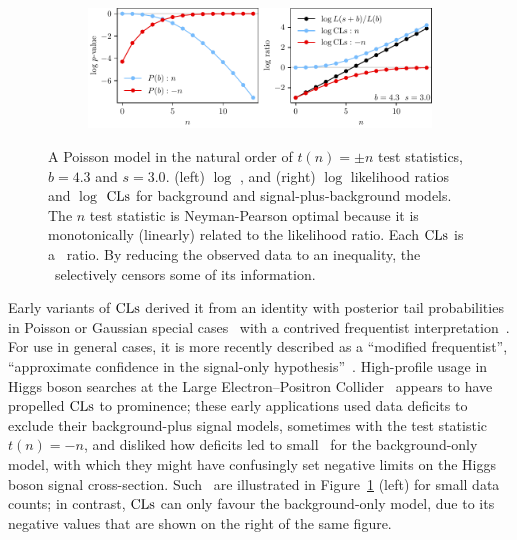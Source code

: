 \begin{figure}[tp]
\centering
\begin{subfigure}{\textwidth}
\centering
\includegraphics[width=\textwidth]{figures/searches_cls_plots_with_pvals_n.pdf}
\end{subfigure}
\caption[
A Poisson model in the natural order
]{%
A Poisson model in the natural order of $t(n) = \pm n$
test statistics, $b = 4.3$ and $s = 3.0$.
(left) $\log$ \pvalues,
and (right) $\log$ likelihood ratios and $\log$ $\mathrm{CLs}$ for
background and signal-plus-background models.
The $n$ test statistic is Neyman-Pearson optimal because it is monotonically
(linearly) related to the likelihood ratio.
Each $\mathrm{CLs}$ is a \pvalue\ ratio.
By reducing the observed data to an inequality, the \pvalue\ selectively
censors some of its information.
}
\label{fig:searches_sb_n}
\end{figure}

Early variants of $\mathrm{CLs}$ derived it from an identity with posterior tail
probabilities in Poisson or Gaussian special cases~\cite{
Helene1983upper,
pdg1988,
read2000modified,
pdg2022ynf
}
with a contrived frequentist interpretation~\cite{zech1988cls}.
For use in general cases, it is more recently described as a
``modified frequentist'',
``approximate confidence in the signal-only hypothesis''~\cite{
read2000modified,
Read2002cls
}.
High-profile usage in Higgs boson searches at the
Large Electron–Positron Collider~\cite{
read1997optimal,
bock1998lower,
etde1998prospects,
junk1999confidence,
lep2000searches,
lep2003search
}
appears to have propelled $\mathrm{CLs}$ to prominence;
these early applications used data deficits to exclude their
background-plus signal models, sometimes with the test statistic $t(n) = -n$,
and disliked how deficits led to small \pvalues\ for the background-only model,
with which they might have confusingly set negative limits on the Higgs boson
signal cross-section.
Such \pvalues\ are illustrated in Figure~\ref{fig:searches_sb_n} (left)
for small data counts;
in contrast, $\mathrm{CLs}$ can only favour the background-only model, due to its
negative values that are shown on the right of the same figure.

